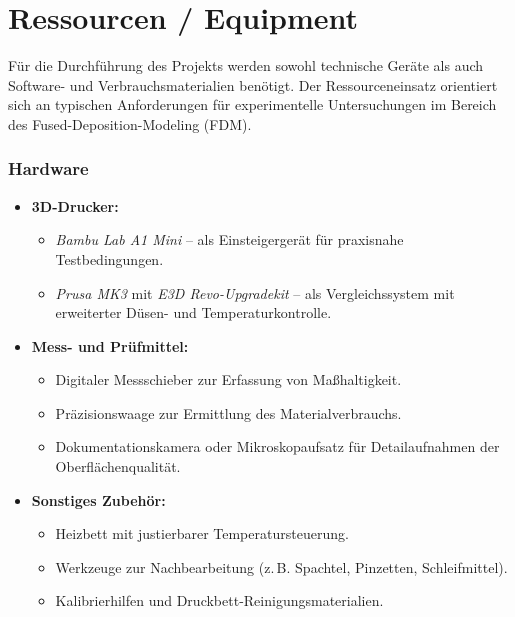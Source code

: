 \chapter{Ressourcen / Equipment}
\label{cha:Ressourcen / Equipment}

Für die Durchführung des Projekts werden sowohl technische Geräte als auch Software- und Verbrauchsmaterialien benötigt.  
Der Ressourceneinsatz orientiert sich an typischen Anforderungen für experimentelle Untersuchungen im Bereich des Fused-Deposition-Modeling (FDM).

\subsection{Hardware}

\begin{itemize}
  \item \textbf{3D-Drucker:}
    \begin{itemize}
      \item \textit{Bambu Lab A1 Mini} – als Einsteigergerät für praxisnahe Testbedingungen.
      \item \textit{Prusa MK3} mit \textit{E3D Revo-Upgradekit} – als Vergleichssystem mit erweiterter Düsen- und Temperaturkontrolle.
    \end{itemize}

  \item \textbf{Mess- und Prüfmittel:}
    \begin{itemize}
      \item Digitaler Messschieber zur Erfassung von Maßhaltigkeit.
      \item Präzisionswaage zur Ermittlung des Materialverbrauchs.
      \item Dokumentationskamera oder Mikroskopaufsatz für Detailaufnahmen der Oberflächenqualität.
    \end{itemize}
  
  \item \textbf{Sonstiges Zubehör:}
    \begin{itemize}
      \item Heizbett mit justierbarer Temperatursteuerung.
      \item Werkzeuge zur Nachbearbeitung (z.\,B. Spachtel, Pinzetten, Schleifmittel).
      \item Kalibrierhilfen und Druckbett-Reinigungsmaterialien.
    \end{itemize}
\end{itemize}

